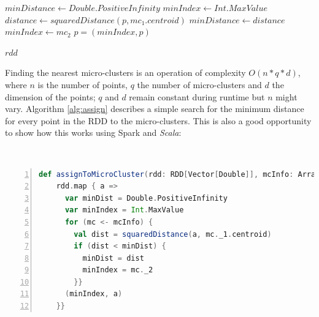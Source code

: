 \documentclass[10pt, conference, compsocconf]{IEEEtran}
\begin{document}
\begin{algorithm}
 \caption{Find nearest micro-cluster.}\label{alg:assign}
 \begin{algorithmic}[1]
  
   

  \vspace{10pt}
  
  \State $minDistance \gets Double.PositiveInfinity$
  \State $minIndex \gets Int.MaxValue$
  \State $distance \gets squaredDistance(p, mc_1.centroid)$
  \State $minDistance \gets distance$
  \State $minIndex \gets mc_2$
  \EndIf
  \EndFor
  \State $p = (minIndex,p)$
  \EndFor
  
  \Return $rdd$
 \end{algorithmic}
\end{algorithm}

Finding the nearest micro-clusters is an operation of complexity $O(n*q*d)$, where $n$ is the number of points, $q$ the number of micro-clusters and $d$ the dimension of the points; $q$ and $d$ remain constant during runtime but $n$ might vary. Algorithm \ref{alg:assign} describes a simple search for the minimum distance for every point in the RDD to the micro-clusters. This is also a good opportunity to show how this works using Spark and \textit{Scala}:

\
\begin{lstlisting}[language=Scala, tabsize=2, breaklines=true,basicstyle=\footnotesize,frame=lines,numbers=left]
def assignToMicroCluster(rdd: RDD[Vector[Double]], mcInfo: Array[(MicroClusterInfo, Int)]): RDD[(Int, Vector[Double])] = {
    rdd.map { a =>
      var minDist = Double.PositiveInfinity
      var minIndex = Int.MaxValue
      for (mc <- mcInfo) {
        val dist = squaredDistance(a, mc._1.centroid)
        if (dist < minDist) {
          minDist = dist
          minIndex = mc._2
        }}
      (minIndex, a)
    }}
\end{lstlisting}
\end{document}
